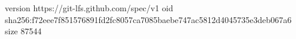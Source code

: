 version https://git-lfs.github.com/spec/v1
oid sha256:f72eee7f851576891fd2fc8057ca7085baebe747ac5812d4045735e3deb067a6
size 87544
